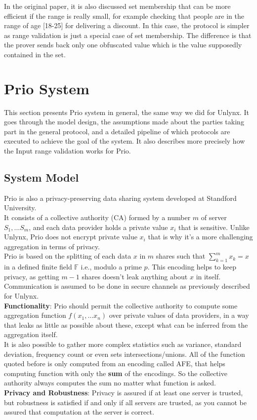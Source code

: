 \documentclass{article}
\begin{document}
In the original paper, it is also discussed set membership that can be more efficient if the range is really small, for example checking that people are in the range of age [18-25] for delivering a discount.
In this case, the protocol is simpler as range validation is just a special case of set membership. The difference is that the prover sends back only one obfuscated value which is the value supposedly contained in the set.

\section{Prio System}
This section presents Prio system in general, the same way we did for Unlynx. It goes through the model design, the assumptions made about the parties taking part in the general protocol, and a detailed pipeline of which protocols are executed to achieve the goal of the system. It also describes more precisely how the Input range validation works for Prio.\\

\subsection{System Model}
Prio \cite{prio}  is also a privacy-preserving data sharing system developed at Standford University.\\
It consists of a collective authority (CA) formed by a number $m$ of server $S_1,...S_m$, and each data provider holds a private value $x_i$ that is sensitive. 
Unlike Unlynx, Prio does not encrypt private value $x_i$ that is why it's a more challenging aggregation in terms of privacy.\\
Prio is based on the splitting of each data $x$ in $m$ shares such that $\sum^m_{k=1}{x_k} = x $ in a defined finite field $\mathbb{F}$ i.e., modulo a prime $p$. This encoding helps to keep privacy, as getting $m-1$ shares doesn't leak anything about $x$ in itself.\\
Communication is assumed to be done in secure channels as previously described for Unlynx.\\
\textbf{Functionality}: Prio should permit the collective authority to compute some aggregation function $f(x_1,...x_n)$ over private values of data providers, in a way that leaks as little as possible about these, except what can be inferred from the aggregation itself.\\
It is also possible to gather more complex statistics such as variance, standard deviation, frequency count or even sets intersections/unions. All of the function quoted before is only computed from an encoding called AFE, that helps computing function with only the \textbf{sum} of the encodings. So the collective authority always computes the sum no matter what function is asked.\\
\textbf{Privacy and Robustness}: Privacy is assured if at least one server is trusted, but robustness is satisfied if and only if all servers are trusted, as you cannot be assured that computation at the server is correct.
\end{document}
